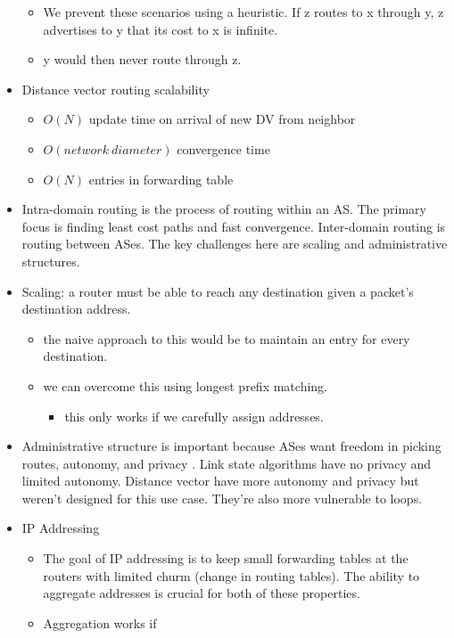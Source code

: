 \documentclass[]{article}
\providecommand{\tightlist}{%
  \setlength{\itemsep}{0pt}\setlength{\parskip}{0pt}}
\begin{document}
\begin{itemize}
  \begin{itemize}
  \tightlist
  \item
    We prevent these scenarios using a heuristic. If z routes to x
    through y, z advertises to y that its cost to x is infinite.
  \item
    y would then never route through z.
  \end{itemize}
\item
  Distance vector routing scalability

  \begin{itemize}
  \tightlist
  \item
    \(O(N)\) update time on arrival of new DV from neighbor
  \item
    \(O(network \ diameter)\) convergence time
  \item
    \(O(N)\) entries in forwarding table
  \end{itemize}
\item
  Intra-domain routing is the process of routing within an AS. The
  primary focus is finding least cost paths and fast convergence.
  Inter-domain routing is routing between ASes. The key challenges here
  are scaling and administrative structures.
\item
  Scaling: a router must be able to reach any destination given a
  packet's destination address.

  \begin{itemize}
  \tightlist
  \item
    the naive approach to this would be to maintain an entry for every
    destination.
  \item
    we can overcome this using longest prefix matching.

    \begin{itemize}
    \tightlist
    \item
      this only works if we carefully assign addresses.
    \end{itemize}
  \end{itemize}
\item
  Administrative structure is important because ASes want freedom in
  picking routes, autonomy, and privacy . Link state algorithms have no
  privacy and limited autonomy. Distance vector have more autonomy and
  privacy but weren't designed for this use case. They're also more
  vulnerable to loops.
\item
  IP Addressing

  \begin{itemize}
  \tightlist
  \item
    The goal of IP addressing is to keep small forwarding tables at the
    routers with limited churm (change in routing tables). The ability
    to aggregate addresses is crucial for both of these properties.
  \item
    Aggregation works if


\end{itemize}
\end{itemize}
\end{document}
